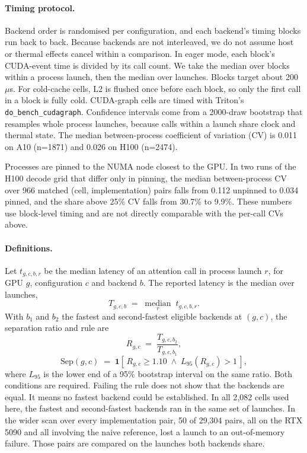 \documentclass[11pt]{article}
\newcommand{\us}{\ensuremath{\mu}s}
\newcommand{\code}[1]{\texttt{\small #1}}
\begin{document}
\paragraph{Timing protocol.} Backend order is randomised per configuration, and
each backend's timing blocks run back to back. Because backends are not
interleaved, we do not assume host or thermal effects cancel within a
comparison. In eager mode, each block's CUDA-event time is divided by its call
count. We take the median over blocks within a process launch, then the median
over launches. Blocks target about 200~\us{}. For cold-cache cells, L2 is
flushed once before each block, so only the first call in a block is fully
cold. CUDA-graph cells are timed with Triton's \code{do\_bench\_cudagraph}.
Confidence intervals come from a 2000-draw bootstrap that resamples whole
process launches, because calls within a launch share clock and thermal state.
The median between-process coefficient of variation (CV) is 0.011 on A10
(n=1871) and 0.026 on H100 (n=2474).

Processes are pinned to the NUMA node closest to the GPU. In two runs of the
H100 decode grid that differ only in pinning, the median between-process CV
over 966 matched (cell, implementation) pairs falls from 0.112 unpinned to
0.034 pinned, and the share above 25\% CV falls from 30.7\% to 9.9\%. These
numbers use block-level timing and are not directly comparable with the
per-call CVs above.

\paragraph{Definitions.} Let $t_{g,c,b,r}$ be the median latency of an attention
call in process launch $r$, for GPU $g$, configuration $c$ and backend $b$. The
reported latency is the median over launches,
%
\begin{equation}
T_{g,c,b} \;=\; \operatorname*{median}_{r}\; t_{g,c,b,r} .
\label{eq:lat}
\end{equation}
%
With $b_1$ and $b_2$ the fastest and second-fastest eligible backends at
$(g,c)$, the separation ratio and rule are
%
\begin{equation}
R_{g,c} \;=\; \frac{T_{g,c,b_2}}{T_{g,c,b_1}} ,
\label{eq:ratio}
\end{equation}
\vspace{-1.1em}
\begin{equation}
\mathrm{Sep}(g,c) \;=\; \mathbf{1}\!\left[\,R_{g,c} \ge 1.10 \;\wedge\;
L_{95}(R_{g,c}) > 1 \,\right],
\label{eq:sep}
\end{equation}
%
where $L_{95}$ is the lower end of a 95\% bootstrap interval on the same ratio.
Both conditions are required. Failing the rule does not show that the backends
are equal. It means no fastest backend could be established. In all 2{,}082
cells used here, the fastest and second-fastest backends ran in the same set of
launches. In the wider scan over every implementation pair, 50 of 29{,}304
pairs, all on the RTX 5090 and all involving the naive reference, lost a launch
to an out-of-memory failure. Those pairs are compared on the launches both
backends share.
\end{document}
